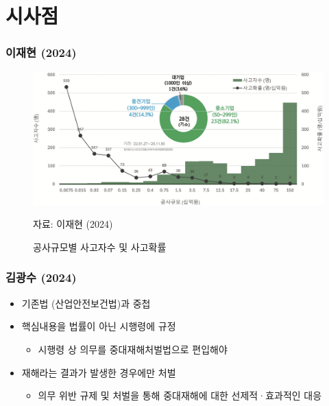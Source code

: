 \documentclass[aspectratio=169,xcolor=dvipsnames,handout]{beamer}
\begin{document}
\section{시사점}
\begin{frame}
    \frametitle{이재현 (2024)}
    \centering
    \begin{figure}
        \includegraphics[width=.8\textwidth]{pic/공사규모별사고자수및확률}
        \\
        \raggedright%
        \hspace{1em}
        \tiny{자료: 이재현 (2024)}
        \caption{공사규모별 사고자수 및 사고확률}
    \end{figure}
\end{frame}

\begin{frame}
    \frametitle{김광수 (2024)}
    \begin{itemize}[<+->]
        \item 기존법 (산업안전보건법)과 중첩
        \item 핵심내용을 법률이 아닌 시행령에 규정
        \begin{itemize}
            \item 시행령 상 의무를 중대재해처벌법으로 편입해야
        \end{itemize}
        \item 재해라는 결과가 발생한 경우에만 처벌 
        \begin{itemize}
            \item 의무 위반 규제 및 처벌을 통해 중대재해에 대한 선제적·효과적인 대응
        \end{itemize}
    \end{itemize}
\end{frame}
\end{document}
